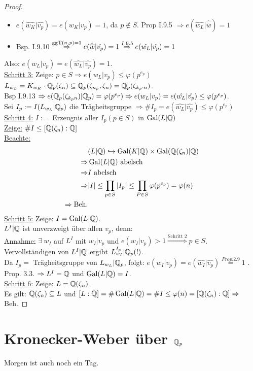 \begin{proof}
\begin{itemize}
\item $e(\hat{w_K} | \hat{v_p}) = e(w_K|v_p)=1$, da $p \not \in S$. Prop I.9.5 $\Rightarrow e(\hat{w_L} | \hat{\overline{w}})=1$
\item Bsp. I.9.10 $\stackrel{\operatorname{ggT}(n,p)=1}{\Rightarrow} e(\hat{\overline{w}}| \hat{v_p})=1 \stackrel{I.9.5}{\Rightarrow} e(\hat{w_L} | \hat{v_p})=1$
\end{itemize}
Also: $e(w_L|v_p)=e(\hat{w_L} | \hat{v_p})=1$.\\
\underline{Schritt 3:} Zeige: $p \in S \Rightarrow e(w_L|v_p) \leq \varphi(p^{e_p})$\\
$L_{w_L} = K_{w_K} \cdot \mathbb{Q}_p(\zeta_n) \subseteq \mathbb{Q}_p(\zeta_{n_p}, \zeta_n)=\mathbb{Q}_p(\zeta_{k_p \cdot n})$.\\
Bsp I.9.13 $\Rightarrow e(\mathbb{Q}_p(\zeta_{k_p n} ) | \mathbb{Q}_p)=\varphi(p^{e_p}) \Rightarrow e(w_L|v_p)=e(\hat{w_L} | \hat{v_p}) \leq \varphi(p^{e_p})$.\\
Sei $I_p:=I(L_{w_L} | \mathbb{Q}_p)$ die Trägheitsgruppe $\Rightarrow \#I_p = e(\hat{w_L} | \hat{v_p}) \leq \varphi(p^{e_p})$\\
\underline{Schritt 4:} $I:=$ Erzeugnis aller $I_p (p \in S)$ in $\operatorname{Gal}(L|\mathbb{Q})$\\
\underline{Zeige:} $\# I \leq [\mathbb{Q}(\zeta_n):\mathbb{Q}]$\\
\underline{Beachte:} \begin{align*}
&(L|\mathbb{Q}) \hookrightarrow \operatorname{Gal}(K|\mathbb{Q})\times \operatorname{Gal}(\mathbb{Q}(\zeta_n)|\mathbb{Q})\\
\Rightarrow &\operatorname{Gal}(L|\mathbb{Q}) \text{ abelsch}\\
\Rightarrow &I \text{ abelsch }\\
\Rightarrow &|I| \leq \prod_{p \in S} |I_p| \leq \prod_{P \in S} \varphi(p^{e_p})=\varphi(n)\\
\Rightarrow \text{Beh.}&
\end{align*}
\underline{Schritt 5:} Zeige: $I=\operatorname{Gal}(L|\mathbb{Q})$.\\
$L^I|\mathbb{Q}$ ist unverzweigt über allen $v_p$, denn:\\
\underline{Annahme:} $\exists \ w_I$ auf $L^I$ mit $w_I | v_p$ und $e(w_I|v_p)>1 \stackrel{\text{Schritt 2}}{\Rightarrow} p \in S$.\\
Vervollständigen von $L^I | \mathbb{Q}$ ergibt $L_{w_I}^{I_p} | \mathbb{Q}_p (!)$.\\
Da $I_p=$ Trägheitsgruppe von $L_{w_L}|\mathbb{Q}_p$, folgt: $e(w_I|v_p)=e(\hat{w_I} | \hat{v_p})\stackrel{Prop. 2.9}{=} 1$ \Lightning.\\
Prop. 3.3. $\Rightarrow L^I=\mathbb{Q}$ und $\operatorname{Gal}(L|\mathbb{Q})=I$.\\
\underline{Schritt 6:} Zeige: $L=\mathbb{Q}(\zeta_n)$.\\
Es gilt: $\mathbb{Q}(\zeta_n) \subseteq L$ und $[L:\mathbb{Q}]=\# \operatorname{Gal}(L|\mathbb{Q})=\# I \leq \varphi(n)=[\mathbb{Q}(\zeta_n):\mathbb{Q}] \Rightarrow$ Beh.
\end{proof}

\section{Kronecker-Weber über $\mathbb{Q}_p$}

Morgen ist auch noch ein Tag.

